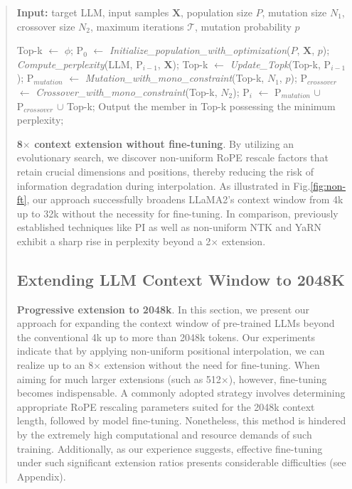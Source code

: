 \begin{abstract}
\begin{algorithm}[t]
	\small
	\caption{The search algorithm}
	\textbf{Input:} target LLM, input samples $\mathbf{X}$, population size $P$, mutation size $N_1$, crossover size $N_2$, maximum iterations $\mathcal{T}$, mutation probability $p$\\

	\begin{algorithmic}[1]
		\label{alg:search}
		\STATE Top-k $\leftarrow$ $\phi$;	
		\STATE $\text{P}_0$ $\leftarrow$ \textit{Initialize\_population\_with\_optimization}($P$, $\mathbf{X}$, $p$); 
		\STATE \textit{Compute\_perplexity}(LLM, $\text{P}_{i-1}$, $\mathbf{X}$);
		\STATE Top-k $\leftarrow$ \textit{Update\_Topk}(Top-k, $\text{P}_{i-1}$);
		\STATE $\text{P}_{mutation}$ $\leftarrow$ \textit{Mutation\_with\_mono\_constraint}(Top-k, $N_1$, $p$);
		\STATE $\text{P}_{crossover}$ $\leftarrow$ \textit{Crossover\_with\_mono\_constraint}(Top-k, $N_2$);
		\STATE $\text{P}_i$ $\leftarrow$ $\text{P}_{mutation}$ $\cup$ $\text{P}_{crossover}$ $\cup$ Top-k;
		\ENDFOR
		\STATE Output the member in Top-k possessing the minimum perplexity;
	\end{algorithmic}
\end{algorithm}

\textbf{8$\times$ context extension without fine-tuning}. By utilizing an evolutionary search, we discover non-uniform RoPE rescale factors that retain crucial dimensions and positions, thereby reducing the risk of information degradation during interpolation. As illustrated in Fig.\ref{fig:non-ft}, our approach successfully broadens LLaMA2's context window from 4k up to 32k without the necessity for fine-tuning. In comparison, previously established techniques like PI as well as non-uniform NTK and YaRN exhibit a sharp rise in perplexity beyond a 2$\times$ extension.

\subsection{Extending LLM Context Window to 2048K}
\label{sec:extendto2048k}

\textbf{Progressive extension to 2048k}. In this section, we present our approach for expanding the context window of pre-trained LLMs beyond the conventional 4k up to more than 2048k tokens. Our experiments indicate that by applying non-uniform positional interpolation, we can realize up to an 8$\times$ extension without the need for fine-tuning. When aiming for much larger extensions (such as 512$\times$), however, fine-tuning becomes indispensable. A commonly adopted strategy involves determining appropriate RoPE rescaling parameters suited for the 2048k context length, followed by model fine-tuning. Nonetheless, this method is hindered by the extremely high computational and resource demands of such training. Additionally, as our experience suggests, effective fine-tuning under such significant extension ratios presents considerable difficulties (see Appendix).


\end{abstract}
